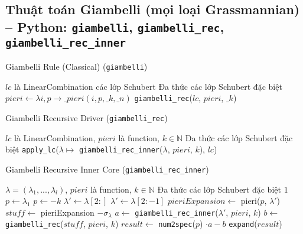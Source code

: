 
\subsection*{Thuật toán Giambelli (mọi loại Grassmannian) -- Python: \texttt{giambelli}, \texttt{giambelli\_rec}, \texttt{giambelli\_rec\_inner}}

\begin{algorithm}[H]
\caption{Giambelli Rule (Classical) (\texttt{giambelli})}
\begin{algorithmic}[1]
\REQUIRE $lc$ là LinearCombination các lớp Schubert
\ENSURE Đa thức các lớp Schubert đặc biệt
\STATE $pieri \gets \lambda i, p \to \_pieri(i, p, \_k, \_n)$
\RETURN \texttt{giambelli\_rec}($lc$, $pieri$, $\_k$)
\end{algorithmic}
\end{algorithm}

\begin{algorithm}[H]
\caption{Giambelli Recursive Driver (\texttt{giambelli\_rec})}
\begin{algorithmic}[1]
\REQUIRE $lc$ là LinearCombination, $pieri$ là function, $k \in \mathbb{N}$
\ENSURE Đa thức các lớp Schubert đặc biệt
\RETURN \texttt{apply\_lc}($\lambda \mapsto$ \texttt{giambelli\_rec\_inner}($\lambda$, $pieri$, $k$), $lc$)
\end{algorithmic}
\end{algorithm}

\begin{algorithm}[H]
\caption{Giambelli Recursive Inner Core (\texttt{giambelli\_rec\_inner})}
\begin{algorithmic}[1]
\REQUIRE $\lambda = (\lambda_1, ..., \lambda_l)$, $pieri$ là function, $k \in \mathbb{N}$
\ENSURE Đa thức các lớp Schubert đặc biệt
    \RETURN $1$
\ENDIF
\STATE $p \gets \lambda_1$
    \STATE $p \gets -k$
\ENDIF
\STATE $\lambda' \gets \lambda[2:]$
    \STATE $\lambda' \gets \lambda[2:-1]$
\ENDIF
\STATE $pieriExpansion \gets$ pieri($p$, $\lambda'$)
\STATE $stuff \gets$ pieriExpansion $- \sigma_\lambda$
\STATE $a \gets$ \texttt{giambelli\_rec\_inner}($\lambda'$, $pieri$, $k$)
\STATE $b \gets$ \texttt{giambelli\_rec}($stuff$, $pieri$, $k$)
\STATE $result \gets$ \texttt{num2spec}($p$) $\cdot a - b$
\RETURN \texttt{expand}($result$)
\end{algorithmic}
\end{algorithm}

